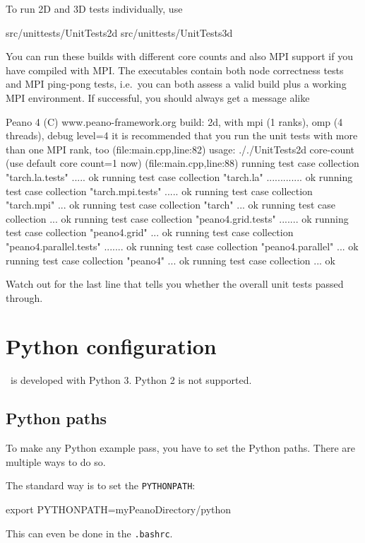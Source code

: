 \noindent
To run 2D and 3D tests individually, use

\begin{code}
  src/unittests/UnitTests2d
  src/unittests/UnitTests3d
\end{code}

\noindent
You can run these builds with different core counts and also MPI support if you
have compiled with MPI.
The executables contain both node correctness tests and MPI ping-pong tests,
i.e.~you can both assess a valid build plus a working MPI environment.
If successful, you should always get a message alike

\begin{code}
Peano 4 (C) www.peano-framework.org 
build: 2d, with mpi (1 ranks), omp (4 threads), debug level=4
it is recommended that you run the unit tests with more than one MPI rank, too (file:main.cpp,line:82)
usage: ././UnitTests2d core-count (use default core count=1 now) (file:main.cpp,line:88)
running test case collection "tarch.la.tests" ..... ok
running test case collection "tarch.la" ............. ok
running test case collection "tarch.mpi.tests" ..... ok
running test case collection "tarch.mpi" ... ok
running test case collection "tarch" ... ok
running test case collection ... ok
running test case collection "peano4.grid.tests" ....... ok
running test case collection "peano4.grid" ... ok
running test case collection "peano4.parallel.tests" ....... ok
running test case collection "peano4.parallel" ... ok
running test case collection "peano4" ... ok
running test case collection ... ok
\end{code}

\noindent
Watch out for the last line that tells you whether the overall unit tests passed
through.

\section{Python configuration}

\Peano\ is developed with Python 3. Python 2 is not supported. 


\subsection{Python paths}
To make any Python example pass, you have to set the Python paths.
There are multiple ways to do so.

The standard way is to set the \texttt{PYTHONPATH}:
\begin{code}
export PYTHONPATH=myPeanoDirectory/python
\end{code}
This can even be done in the \texttt{.bashrc}.

